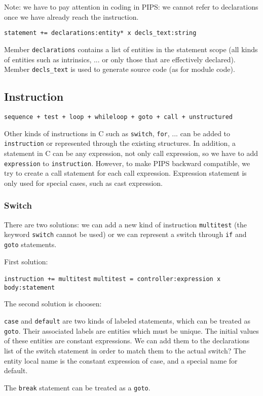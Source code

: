 \documentclass[a4paper]{article}
\begin{document}
Note: we have to pay attention in coding in
PIPS: we cannot refer to declarations once we have already reach the
instruction.   

\verb/statement += declarations:entity* x decls_text:string/

Member \verb/declarations/ contains a list of entities in the statement
scope (all kinds of entities such as intrinsics, ... or only those that
are effectively declared).  Member \verb/decls_text/ is used to generate source code (as for module code).

\subsection{Instruction}

\verb/sequence + test + loop + whileloop + goto + call + unstructured/

Other kinds of instructions in C such as \verb/switch/, \verb/for/, ... can be
added to \verb/instruction/ or represented through the existing structures. 
In addition, a statement in C can be any expression, not only call
expression, so we have to add \verb/expression/ to \verb/instruction/. 
However, to make PIPS backward compatible, we try to create a call
statement for each call expression. Expression statement is only used for
special cases, such as cast expression.
 
\subsubsection{Switch}
There are two solutions: we can add a new kind of instruction
\verb/multitest/ (the keyword \verb/switch/ cannot be used) or we can
represent a switch through \verb/if/ and \verb/goto/ statements.  

First solution: 

\verb/instruction += multitest/
\verb/multitest = controller:expression x body:statement/

The second solution is choosen: 
 
\verb/case/ and \verb/default/ are two kinds of labeled statements, which
can be treated as \verb/goto/. Their
associated labels are entities which must be unique.  The initial values of these
entities are constant expressions. We can add them to the
declarations list of the switch statement in order to match them to the actual
switch? The entity local name is the constant expression of case, and a
special name for default.  

The \verb/break/ statement can be treated as a \verb/goto/.
\end{document}
